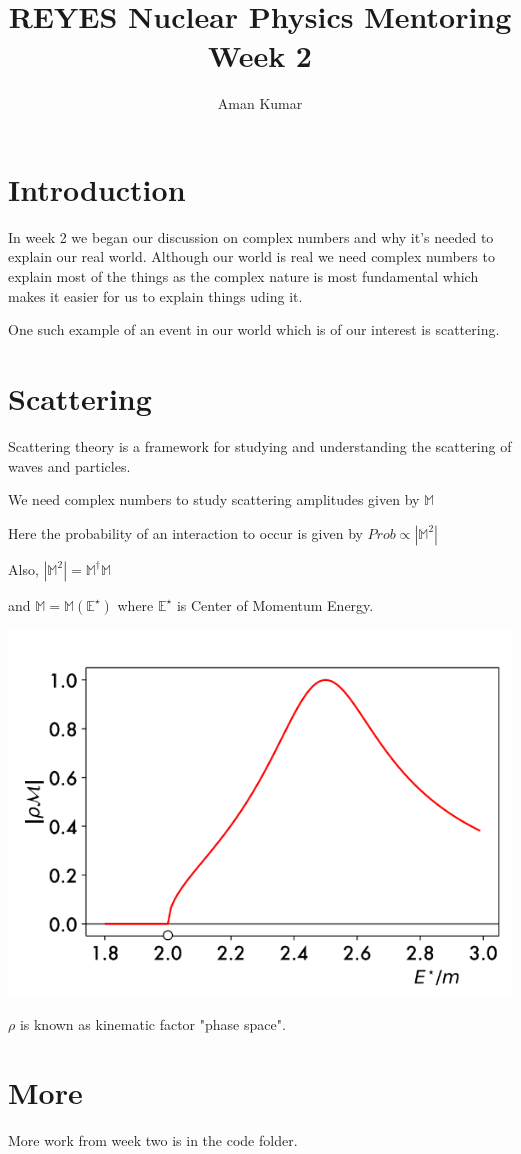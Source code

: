 \documentclass[a4paper]{article}
\title{REYES Nuclear Physics Mentoring Week 2}
\author{Aman Kumar}
\begin{document}
\maketitle
\section{Introduction}
In week 2 we began our discussion on complex numbers and why it's needed to explain our real world. Although our world is real
we need complex numbers to explain most of the things as the complex nature is most fundamental which makes it easier for us to explain things uding it.
 
One such example of an event in our world which is of our interest is scattering.
\section{Scattering}
Scattering theory is a framework for studying and understanding the scattering of waves and particles.

We need complex numbers to study scattering amplitudes given by $\mathbb{M}$

Here the probability of an interaction to occur is given by $Prob \propto |\mathbb{M}^{2}|$

Also,  $ |\mathbb{M}^{2}| = \mathbb{M}^{\dagger} \mathbb{M} $

and $ \mathbb{M} = \mathbb{M} (\mathbb{E}^{\star})  $ where $\mathbb{E}^{\star}$ is Center of Momentum Energy.

\includegraphics{aimg}


$ \rho $ is known as kinematic factor "phase space".

\section{More}

More work from week two is in the code folder.
\end{document}
